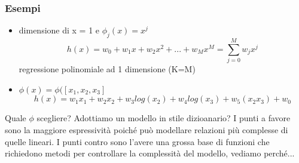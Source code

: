 \documentclass{article}
\begin{document}
\subsubsection{Esempi}
\begin{itemize}
    \item dimensione di x = 1 e $\phi_j(x)=x^j$ 
    \begin{equation}
    h(x) = w_0+w_1x+w_2x^2+...+w_Mx^M=\sum_{j = 0}^M w_jx^j
    \end{equation}
    regressione polinomiale ad 1 dimensione (K=M)
    \item $\phi(x)=\phi([x_1,x_2,x_3]$
    \begin{equation}
    h(x) = w_1x_1+w_2x_2+w_3log(x_2)+w_4log(x_3)+w_5(x_2x_3)+w_0
    \end{equation}
\end{itemize}
Quale $\phi$ scegliere? Adottiamo un modello in stile dizioanario? I punti a favore sono la maggiore espressività poiché può modellare relazioni più complesse di quelle lineari. I punti contro sono l'avere una grossa base di funzioni che richiedono metodi per controllare la complessità del modello, vediamo perché...
\end{document}
